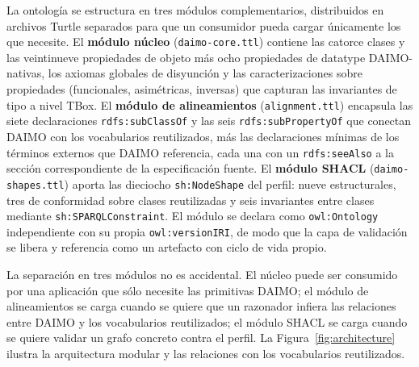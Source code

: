 \documentclass[Afour,sagev,times]{sagej}
\newcommand{\code}[1]{\texttt{#1}}
\begin{document}
La ontología se estructura en tres módulos complementarios, distribuidos en archivos Turtle separados para que un consumidor pueda cargar únicamente los que necesite. El \textbf{módulo núcleo} (\code{daimo-core.ttl}) contiene las catorce clases y las veintinueve propiedades de objeto más ocho propiedades de datatype DAIMO-nativas, los axiomas globales de disyunción y las caracterizaciones sobre propiedades (funcionales, asimétricas, inversas) que capturan las invariantes de tipo a nivel TBox. El \textbf{módulo de alineamientos} (\code{alignment.ttl}) encapsula las siete declaraciones \code{rdfs:subClassOf} y las seis \code{rdfs:subPropertyOf} que conectan DAIMO con los vocabularios reutilizados, más las declaraciones mínimas de los términos externos que DAIMO referencia, cada una con un \code{rdfs:seeAlso} a la sección correspondiente de la especificación fuente. El \textbf{módulo SHACL} (\code{daimo-shapes.ttl}) aporta las dieciocho \code{sh:NodeShape} del perfil: nueve estructurales, tres de conformidad sobre clases reutilizadas y seis invariantes entre clases mediante \code{sh:SPARQLConstraint}. El módulo se declara como \code{owl:Ontology} independiente con su propia \code{owl:versionIRI}, de modo que la capa de validación se libera y referencia como un artefacto con ciclo de vida propio.

La separación en tres módulos no es accidental. El núcleo puede ser consumido por una aplicación que sólo necesite las primitivas DAIMO; el módulo de alineamientos se carga cuando se quiere que un razonador infiera las relaciones entre DAIMO y los vocabularios reutilizados; el módulo SHACL se carga cuando se quiere validar un grafo concreto contra el perfil. La Figura~\ref{fig:architecture} ilustra la arquitectura modular y las relaciones con los vocabularios reutilizados.
\end{document}
